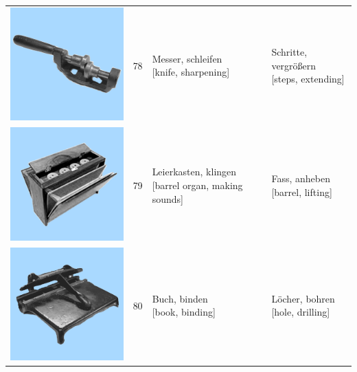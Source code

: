 \documentclass[
  english,
  doc,12pt,twoside,floatsintext]{apa7}
\begin{document}
\begin{center}
\begin{ThreePartTable}
{\begin{longtable}{llll}
\includegraphics[valign=c, scale=0.23]{../materials/unfamiliar/78.png} & 78 & \makecell[l]{Messer, schleifen\\{[knife, sharpening]}} & \makecell[l]{Schritte, vergrößern\\{[steps, extending]}}\\
\includegraphics[valign=c, scale=0.23]{../materials/unfamiliar/79.png} & 79 & \makecell[l]{Leierkasten, klingen\\{[barrel organ, making sounds]}} & \makecell[l]{Fass, anheben\\{[barrel, lifting]}}\\
\includegraphics[valign=c, scale=0.23]{../materials/unfamiliar/80.png} & 80 & \makecell[l]{Buch, binden\\{[book, binding]}} & \makecell[l]{Löcher, bohren\\{[hole, drilling]}}\\

\end{longtable}}
\end{ThreePartTable}
\end{center}
\end{document}
